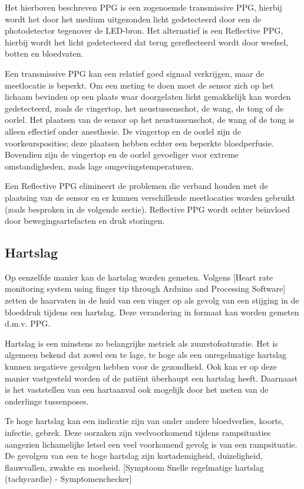 \documentclass[11pt]{article}
\begin{document}
    Het hierboven beschreven PPG is een zogenoemde transmissive PPG, hierbij wordt het door het medium uitgezonden licht gedetecteerd door een de photodetector tegenover de LED-bron. 
    Het alternatief is een Reflective PPG, hierbij wordt het licht gedetecteerd dat terug gereflecteerd wordt door weefsel, botten en bloedvaten.

    Een transmissive PPG kan een relatief goed signaal verkrijgen, maar de meetlocatie is beperkt. 
    Om een meting te doen moet de sensor zich op het lichaam bevinden op een plaats waar doorgelaten licht gemakkelijk kan worden gedetecteerd, zoals de vingertop, het neustussenschot, de wang, de tong of de oorlel. 
    Het plaatsen van de sensor op het neustussenschot, de wang of de tong is alleen effectief onder anesthesie. 
    De vingertop en de oorlel zijn de voorkeursposities; deze plaatsen hebben echter een beperkte bloedperfusie. 
    Bovendien zijn de vingertop en de oorlel gevoeliger voor extreme omstandigheden, zoals lage omgevingstemperaturen.

    Een Reflective PPG elimineert de problemen die verband houden met de plaatsing van de sensor en er kunnen verschillende meetlocaties worden gebruikt (zoals besproken in de volgende sectie). 
    Reflective PPG wordt echter beïnvloed door bewegingsartefacten en druk storingen. 

    \subsection{Hartslag}
    Op eenzelfde manier kan de hartslag worden gemeten. 
    Volgens [Heart rate monitoring system using finger tip through Arduino and Processing Software] zetten de haarvaten in de huid van een vinger op als gevolg van een stijging in de bloeddruk tijdens een hartslag. 
    Deze verandering in formaat kan worden gemeten d.m.v. PPG.

    Hartslag is een minstens zo belangrijke metriek als zuurstofsaturatie. Het is algemeen bekend dat zowel een te lage, te hoge als een onregelmatige hartslag kunnen negatieve gevolgen hebben voor de gezondheid. 
    Ook kan er op deze manier vastgesteld worden of de patiënt überhaupt een hartslag heeft.
    Daarnaast is het vaststellen van een hartaanval ook mogelijk door het meten van de onderlinge tussenposes. 

    Te hoge hartslag kan een indicatie zijn van onder andere bloedverlies, koorts, infectie, gebrek. 
    Deze oorzaken zijn veelvoorkomend tijdens rampsituaties aangezien lichamelijke letsel een veel voorkomend gevolg is van een rampsituatie. 
    De gevolgen van een te hoge hartslag zijn kortademigheid, duizeligheid, flauwvallen, zwakte en moeheid.
    [Symptoom Snelle regelmatige hartslag (tachycardie) - Symptomenchecker]
\end{document}
